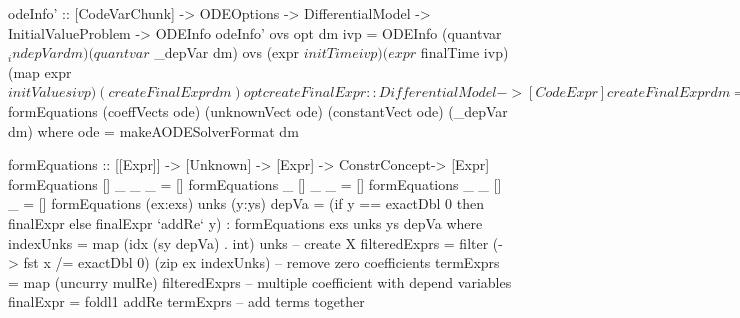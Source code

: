 \begin{listing}[ht]
\begin{haskell1}
odeInfo' :: [CodeVarChunk] -> ODEOptions -> DifferentialModel -> InitialValueProblem -> ODEInfo
odeInfo' ovs opt dm ivp = ODEInfo 
  (quantvar $ _indepVar dm) 
  (quantvar $ _depVar dm) 
  ovs 
  (expr $ initTime ivp)
  (expr $ finalTime ivp)
  (map expr $ initValues ivp)
  (createFinalExpr dm)
  opt

createFinalExpr :: DifferentialModel -> [CodeExpr]
createFinalExpr dm = map expr $ formEquations (coeffVects ode) (unknownVect ode) (constantVect ode) (_depVar dm)
  where ode = makeAODESolverFormat dm

formEquations :: [[Expr]] -> [Unknown] -> [Expr] -> ConstrConcept-> [Expr]
formEquations [] _ _ _ = []
formEquations _ [] _ _ = []
formEquations _ _ [] _ = []
formEquations (ex:exs) unks (y:ys) depVa =
  (if y == exactDbl 0 then finalExpr else finalExpr `addRe` y) : formEquations exs unks ys depVa
  where indexUnks = map (idx (sy depVa) . int) unks -- create X
        filteredExprs = filter (\x -> fst x /= exactDbl 0) (zip ex indexUnks) -- remove zero coefficients
        termExprs = map (uncurry mulRe) filteredExprs -- multiple coefficient with depend variables
        finalExpr = foldl1 addRe termExprs -- add terms together
\end{haskell1}
\label{code_generateodeinfo}
\end{listing}
